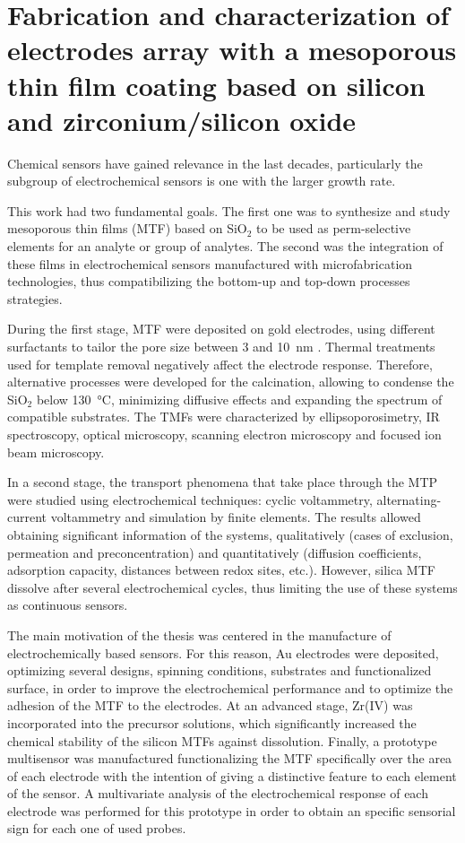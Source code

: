 \cleardoublepage

\mtcaddchapter[Abstract]
\section*{\centering\large{\bfseries{Fabrication and characterization of electrodes array with a mesoporous thin film coating based on silicon and zirconium/silicon oxide}}}

\vspace*{\fill}

Chemical sensors have gained relevance in the last decades, particularly the subgroup of electrochemical sensors is one with the larger growth rate.

This work had two fundamental goals. The first one was to synthesize and study mesoporous thin films (MTF) based on SiO$_2$ to be used as perm-selective elements for an analyte or group of analytes. The second was the integration of these films in electrochemical sensors manufactured with microfabrication technologies, thus compatibilizing the bottom-up and top-down processes strategies.

During the first stage, MTF were deposited on gold electrodes, using different surfactants to tailor the pore size between  3 and \SI{10}{\nm} . Thermal treatments used for template removal negatively affect the electrode response. Therefore, alternative processes were developed for the calcination, allowing to condense the SiO$_2$ below \SI{130}{\celsius}, minimizing diffusive effects and expanding the spectrum of compatible substrates. The TMFs were characterized by ellipsoporosimetry, IR spectroscopy, optical microscopy, scanning electron microscopy and focused ion beam microscopy.

In a second stage, the transport phenomena that take place through the MTP were studied using electrochemical techniques: cyclic voltammetry, alternating-current voltammetry and simulation by finite elements. The results allowed obtaining significant information of the systems, qualitatively (cases of exclusion, permeation and preconcentration) and quantitatively (diffusion coefficients, adsorption capacity, distances between redox sites, etc.). However, silica MTF dissolve after several electrochemical cycles, thus limiting the use of these systems as continuous sensors.

The main motivation of the thesis was centered in the manufacture of electrochemically based sensors. For this reason, Au electrodes were deposited, optimizing several designs, spinning conditions, substrates and functionalized surface, in order to improve the electrochemical performance and to optimize the adhesion of the MTF to the electrodes. At an advanced stage, Zr(IV) was incorporated into the precursor solutions, which significantly increased the chemical stability of the silicon MTFs against dissolution. Finally, a prototype multisensor was manufactured functionalizing the MTF specifically over the area of each electrode with the intention of giving a distinctive feature to each element of the sensor. A multivariate analysis of the electrochemical response of each electrode was performed for this prototype in order to obtain an specific sensorial sign for each one of used probes.

